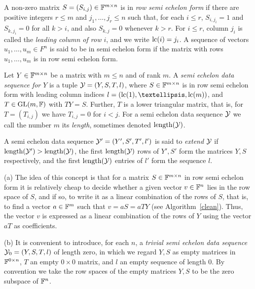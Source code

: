 \begin{Def}
\label{rowsemieche}
    A non-zero matrix $S = (S_{i,j}) \in \mathbb{F}^{m \times n}$ is in 
    \emph{row semi echelon form} if there are positive 
    integers $r \le m$ and $j_1,\ldots,j_r \le n$ such that,
    for each $i \le r$, $S_{i,j_i} = 1$ and $S_{k,j_i} = 0$ for all $k > i$, 
    and also $S_{k,j} = 0$ whenever $k > r$. For $i \le r$, column 
    $j_i$ is called the \emph{leading column of row $i$}, and we write
    $\mathrm{lc}(i) = j_i$. A sequence of vectors $u_1,\ldots,u_m \in F^n$ is 
    said to be in semi echelon form if the matrix with rows 
    $u_1,\ldots,u_m$ is in row semi echelon form.
\end{Def}

\begin{Def}
\label{semiecheseq}
Let $Y \in \mathbb{F}^{m \times n}$ be a matrix with $m \le n$ and of rank $m$. A 
    \emph{semi echelon data sequence for $Y$} is a tuple $\mathcal{Y}=
(Y,S,T,l)$, where
    $S \in \mathbb{F}^{m \times n}$ is in row semi echelon form with
    leading column indices $l = (\lc(1), \ldots, \lc(m))$, and
    $T \in \GL(m,\F)$ with $TY=S$. Further, $T$ is a lower triangular
    matrix, that is, for $T = (T_{i,j})$ we have
    $T_{i,j} = 0$ for $i < j$. For a semi echelon data sequence $\mathcal{Y}$
    we call the number $m$ its \emph{length}, sometimes denoted
    $\mathrm{length}(\mathcal{Y})$.

A semi echelon data sequence $\mathcal{Y}'=(Y',S',T',l')$ is said to 
\emph{extend} $\mathcal{Y}$
if $\mathrm{length}(\mathcal{Y}')>\mathrm{length}(\mathcal{Y})$, the first $\mathrm{length}(\mathcal{Y})$ rows of $Y', S'$ form
the matrices $Y, S$ respectively, and the first $\mathrm{length}(\mathcal{Y})$ entries of $l'$
form the sequence $l$. 
\end{Def}

\begin{Rem}\label{rem:seds}
(a) The idea of this concept is that for a matrix 
$S \in \mathbb{F}^{m\times n}$ in row semi echelon form it is relatively
cheap to decide whether a given vector $v \in \mathbb{F}^n$ lies in the row
space of $S$, and if so, to write it as a linear combination of the
rows of $S$, that is, to find a vector $a \in \mathbb{F}^m$ such that
$v = aS = aTY$ (see Algorithm~\ref{clean}). Thus, the vector
$v$ is expressed as a linear combination of the rows of $Y$
using the vector $aT$ as coefficients.

(b) It is convenient to introduce, for each $n$, a \emph{trivial semi echelon data 
sequence} $\mathcal{Y}_0=(Y,S,T,l)$ of length zero, in which we regard $Y, S$ as 
empty matrices in $\mathbb{F}^{0\times n}$, $T$ an empty $0\times 0$ matrix, and 
$l$ an empty sequence of length $0$. By convention we take the row spaces of
the empty matrices $Y, S$ to be the zero subspace of $\mathbb{F}^n$.  
\end{Rem}


